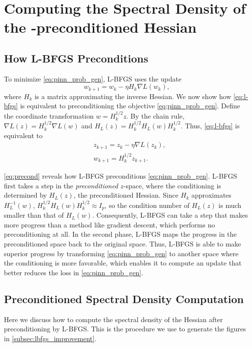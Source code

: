 \section{Computing the Spectral Density of the \lbfgs{}-preconditioned Hessian}
\label{sec:lbfgs_spectral_info}

\subsection{How L-BFGS Preconditions} 
\label{subsec:how_lbfgs_preconditions}
To minimize \eqref{eq:pinn_prob_gen}, L-BFGS uses the update
\begin{equation}
\label{eq:l-bfgs}
w_{k+1} = w_k-\eta H_k \nabla L(w_k), 
\end{equation}
where $H_k$ is a matrix approximating the inverse Hessian.
We now show how \eqref{eq:l-bfgs} is equivalent to preconditioning the objective \eqref{eq:pinn_prob_gen}.
Define the coordinate transformation $w = H_k^{1/2}z$. 
By the chain rule, $\nabla L(z) = H_k^{1/2}\nabla L(w)$ and $H_L(z) = H^{1/2}_k H_L(w)H_k^{1/2}$. 
Thus, \eqref{eq:l-bfgs} is equivalent to
\begin{align}
\label{eq:precond}
    & z_{k+1} = z_k-\eta \nabla L(z_k), \\
    & w_{k+1} = H^{1/2}_kz_{k+1}. \nonumber
\end{align}

\cref{eq:precond} reveals how L-BFGS preconditions \eqref{eq:pinn_prob_gen}.
L-BFGS first takes a step in the \emph{preconditioned} $z$-space, where the conditioning is determined by $H_L(z)$, the preconditioned Hessian. 
Since $H_k$ approximates $H_L^{-1}(w)$, $H^{1/2}_k H_L(w) H_k^{1/2} \approx I_p$, so the condition number of $H_L(z)$ is much smaller than that of $H_L(w)$. 
Consequently, L-BFGS can take a step that makes more progress than a method like gradient descent, which performs no preconditioning at all. 
In the second phase, L-BFGS maps the progress in the preconditioned space back to the original space.
Thus, L-BFGS is able to make superior progress by transforming \eqref{eq:pinn_prob_gen} to another space where the conditioning is more favorable, which enables it to compute an update that better reduces the loss in \eqref{eq:pinn_prob_gen}.

\subsection{Preconditioned Spectral Density Computation}
Here we discuss how to compute the spectral density of the Hessian after preconditioning by L-BFGS.
This is the procedure we use to generate the figures in \cref{subsec:lbfgs_improvement}. 

